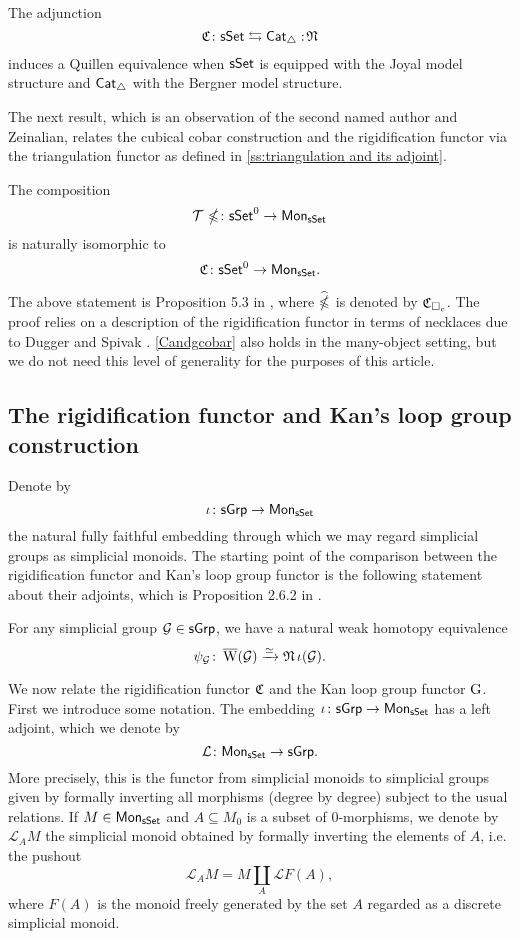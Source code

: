 \begin{proposition} \label{joyalbergner}
	The adjunction
	\[
	\operatorname{\mathfrak{C}} \colon \mathsf{sSet} \leftrightarrows \mathsf{Cat}_{\triangle} :\!\operatorname{\mathfrak{N}}
	\]
	induces a Quillen equivalence when $\mathsf{sSet}$ is equipped with the Joyal model structure and $\mathsf{Cat}_{\triangle}$ with the Bergner model structure.
\end{proposition}

The next result, which is an observation of the second named author and Zeinalian, relates the cubical cobar construction and the rigidification functor via the triangulation functor as defined in \cref{ss:triangulation and its adjoint}.

\begin{proposition} \label{Candgcobar}
	The composition
	\[
	\mathcal{T} \, \operatorname{\mathbb{\Omega}} \colon \mathsf{sSet}^0 \to \mathsf{Mon}_{\mathsf{sSet}}
	\]
	is naturally isomorphic to
	\[
	\operatorname{\mathfrak{C}} \colon \mathsf{sSet}^0 \to \mathsf{Mon}_{\mathsf{sSet}}.
	\]
\end{proposition}

The above statement is Proposition 5.3 in \cite{rivera2018cubical}, where $\operatorname{\widehat{\mathbb{\Omega}}}$ is denoted by $\operatorname{\mathfrak{C}}_{\square_c}$.
The proof relies on a description of the rigidification functor in terms of necklaces due to Dugger and Spivak \cite{dugger2011rigidification}.
\cref{Candgcobar} also holds in the many-object setting, but we do not need this level of generality for the purposes of this article.

\subsection{The rigidification functor and Kan's loop group construction}

Denote by
\[
\iota \colon \mathsf{sGrp} \to \mathsf{Mon}_{\mathsf{sSet}}
\]
the natural fully faithful embedding through which we may regard simplicial groups as simplicial monoids. The starting point of the comparison between the rigidification functor and Kan's loop group functor is the following statement about their adjoints, which is Proposition 2.6.2 in \cite{hinich2007deformation}.

\begin{proposition} \label{p:hinich}
	For any simplicial group $\mathcal{G} \in \mathsf{sGrp}$, we have a natural weak homotopy equivalence
	\[
	\psi_{\mathcal{G}} \colon \operatorname{\overline{W}}(\mathcal{G}) \xrightarrow{\simeq} \operatorname{\mathfrak{N}}\iota(\mathcal{G}).
	\]
\end{proposition}

We now relate the rigidification functor $\operatorname{\mathfrak{C}}$ and the Kan loop group functor $\operatorname{G}$.
First we introduce some notation.
The embedding $\iota \colon \mathsf{sGrp} \to \mathsf{Mon}_{\mathsf{sSet}}$ has a left adjoint, which we denote by
\[
\mathcal{L} \colon \mathsf{Mon}_{\mathsf{sSet}} \to \mathsf{sGrp}.
\]
More precisely, this is the functor from simplicial monoids to simplicial groups given by formally inverting all morphisms (degree by degree) subject to the usual relations.
If $M \in \mathsf{Mon}_{\mathsf{sSet}}$ and $A \subseteq M_0$ is a subset of $0$-morphisms, we denote by $\mathcal{L}_AM$ the simplicial monoid obtained by formally inverting the elements of $A$, i.e. the pushout
\[
\mathcal{L}_AM= M \coprod_A \mathcal{L}F(A),
\]
where $F(A)$ is the monoid freely generated by the set $A$ regarded as a discrete simplicial monoid.

